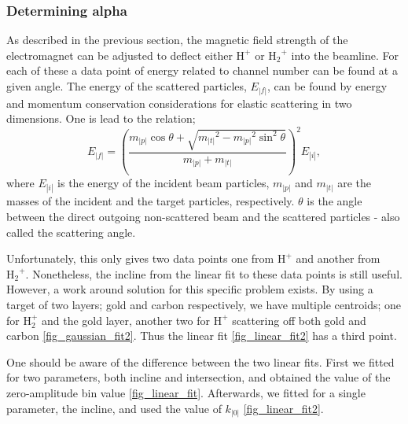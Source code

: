  
\subsubsection{Determining alpha}
As described in the previous section, the magnetic field strength of the
electromagnet can be adjusted to deflect either $\mathrm{H^+}$ or
$\mathrm{{H_2}^+}$ into the beamline. For each of these a data point of energy
related to channel number can be found at a given angle.
The energy of the scattered particles, $E_|f|$, can be found by energy and
momentum conservation considerations for elastic scattering in two dimensions.
One is lead to the relation;
\begin{equation}
E_|f| = \left( \frac{m_|p| \cos\theta + \sqrt{{m_|t|}^2 - {m_|p|}^2
\sin^2\theta}}{m_|p|+m_|t|} \right)^2 E_|i|,
\label{eq_5}
\end{equation}
where $E_|i|$ is the energy of the incident beam particles, $m_|p|$ and $m_|t|$ are
the masses of the incident and the target particles, respectively. 
$\theta$ is the angle between the direct outgoing non-scattered beam and the
scattered particles - also called the scattering angle.

Unfortunately, this only gives two data points one from $\mathrm{H^+}$ and
another from $\mathrm{{H_2}^+}$. Nonetheless, the incline from the linear fit
to these data points is still useful. However, a work around solution
for this specific problem exists. By using a target of two layers; gold and carbon
respectively, we have multiple centroids; one for $\mathrm{H_2^+}$ and the gold
layer, another two for $\mathrm{H^+}$
scattering off both gold and carbon \cref{fig_gaussian_fit2}. Thus the linear fit
\cref{fig_linear_fit2} has a third point.

One should be aware of the difference between the two linear fits. First we
fitted for two parameters, both incline and intersection, and obtained the
value of the zero-amplitude bin value \cref{fig_linear_fit}. Afterwards, we fitted for a single
parameter, the incline, and used the value of $k_|0|$ \cref{fig_linear_fit2}.

